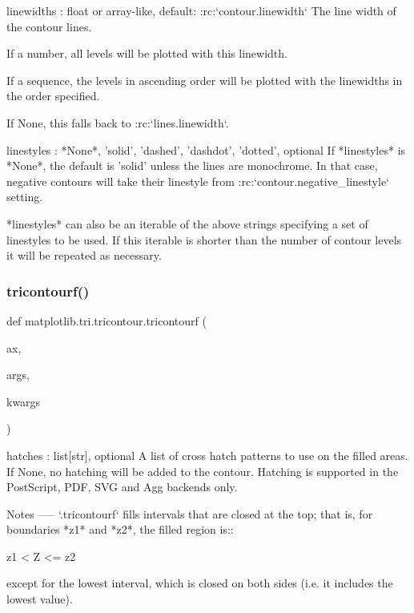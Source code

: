 \begin{DoxyVerb}%

linewidths : float or array-like, default: :rc:`contour.linewidth`
    The line width of the contour lines.

    If a number, all levels will be plotted with this linewidth.

    If a sequence, the levels in ascending order will be plotted with
    the linewidths in the order specified.

    If None, this falls back to :rc:`lines.linewidth`.

linestyles : {*None*, 'solid', 'dashed', 'dashdot', 'dotted'}, optional
    If *linestyles* is *None*, the default is 'solid' unless the lines are
    monochrome.  In that case, negative contours will take their linestyle
    from :rc:`contour.negative_linestyle` setting.

    *linestyles* can also be an iterable of the above strings specifying a
    set of linestyles to be used. If this iterable is shorter than the
    number of contour levels it will be repeated as necessary.
\end{DoxyVerb}
 \mbox{\label{namespacematplotlib_1_1tri_1_1tricontour_ae66e57ea407e6786886bb7b0da9f8af1}} 
\subsubsection{\texorpdfstring{tricontourf()}{tricontourf()}}
{\footnotesize\ttfamily def matplotlib.\+tri.\+tricontour.\+tricontourf (\begin{DoxyParamCaption}\item[{}]{ax,  }\item[{}]{args,  }\item[{}]{kwargs }\end{DoxyParamCaption})}

\begin{DoxyVerb}%

hatches : list[str], optional
    A list of cross hatch patterns to use on the filled areas.
    If None, no hatching will be added to the contour.
    Hatching is supported in the PostScript, PDF, SVG and Agg
    backends only.

Notes
-----
`.tricontourf` fills intervals that are closed at the top; that is, for
boundaries *z1* and *z2*, the filled region is::

    z1 < Z <= z2

except for the lowest interval, which is closed on both sides (i.e. it
includes the lowest value).
\end{DoxyVerb}
 